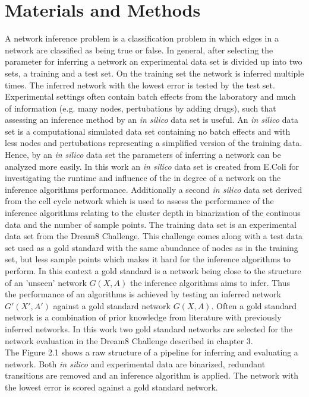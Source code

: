 \chapter{Materials and Methods}
A network inference problem is a classification problem in which edges in a network are classified as being true or false. In general, after selecting the parameter for inferring a network an experimental data set is divided up into two sets, a training and a test set. On the training set the network is inferred multiple times. The inferred network with the lowest error is tested by the test set. Experimental settings often contain batch effects from the laboratory and much of information (e.g. many nodes, pertubations by adding drugs), such that assessing an inference method by an \textit{in silico} data set is useful. An \textit{in silico} data set is a computational simulated data set containing no batch effects and with less nodes and pertubations representing a simplified version of the training data. Hence, by an \textit{in silico} data set the parameters of inferring a network can be analyzed more easily. In this work an \textit{in silico} data set is created from E.Coli for investigating the runtime and influence of the in degree of a network on the inference algorithms performance. Additionally a second \textit{in silico} data set derived from the cell cycle network which is used to assess the performance of the inference algorithms relating to the cluster depth in binarization of the continous data and the number of sample points. The training data set is an experimental data set from the Dream8 Challenge. This challenge comes along with a test data set used as a gold standard with the same abundance of nodes as in the training set, but less sample points which makes it hard for the inference algorithms to perform. In this context a gold standard is a network being close to the structure of an 'unseen' network $G(X,A)$ the inference algorithms aims to infer. Thus the performance of an algorithms is achieved by testing an inferred network $G'(X',A')$ against a gold standard network $G(X,A)$. Often a gold standard network is a combination of prior knowledge from literature with previously inferred networks. In this work two gold standard networks are selected for the network evaluation in the Dream8 Challenge described in chapter 3.\\ 
The Figure 2.1 shows a raw structure of a pipeline for inferring and evaluating a network. Both \textit{in silico} and experimental data are binarized, redundant transitions are removed and an inference algorithm is applied. The network with the lowest error is scored against a gold standard network. 
